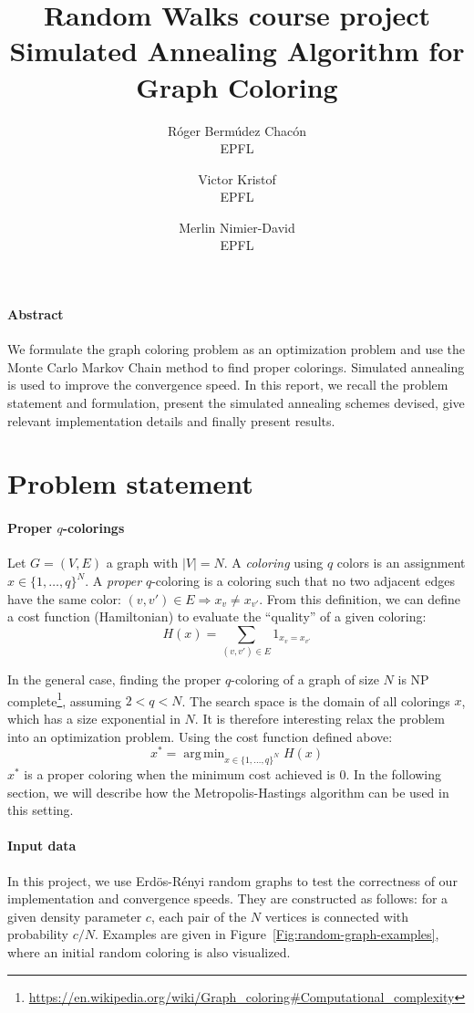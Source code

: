 \documentclass{report}
\title{Random Walks course project\\Simulated Annealing Algorithm for Graph Coloring}
\author{
  R\'oger Berm\'udez Chac\'on\\EPFL
  \and
  Victor Kristof\\EPFL
  \and
  Merlin Nimier-David\\EPFL
}
\DeclareMathOperator*{\argmin}{arg\,min}
\begin{document}
  \maketitle

  \paragraph{Abstract}
  We formulate the graph coloring problem as an optimization problem and use the Monte Carlo Markov Chain method to find proper colorings. Simulated annealing is used to improve the convergence speed. In this report, we recall the problem statement and formulation, present the simulated annealing schemes devised, give relevant implementation details and finally present results.

  \section*{Problem statement}
  \paragraph{Proper $q$-colorings}
  Let $G = (V, E)$ a graph with $|V| = N$. A \emph{coloring} using $q$ colors is an assignment $x \in \{ 1, \ldots, q \}^N$. A \emph{proper} $q$-coloring is a coloring such that no two adjacent edges have the same color: $(v, v') \in E \Rightarrow x_v \neq x_{v'}$. From this definition, we can define a cost function (Hamiltonian) to evaluate the ``quality'' of a given coloring:
  \[
    H(x) = \sum_{(v, v') \in E} 1_{x_v = x_{v'}}
  \]

  In the general case, finding the proper $q$-coloring of a graph of size $N$ is NP complete\footnote{\url{https://en.wikipedia.org/wiki/Graph_coloring#Computational_complexity}}, assuming $2 < q < N$. The search space is the domain of all colorings $x$, which has a size exponential in $N$. It is therefore interesting relax the problem into an optimization problem. Using the cost function defined above:
  \[
    x^* = \argmin_{x \in \{ 1, \ldots, q \}^N} H(x)
  \]
  $x^*$ is a proper coloring when the minimum cost achieved is $0$. In the following section, we will describe how the Metropolis-Hastings algorithm can be used in this setting.

  \paragraph{Input data}
  In this project, we use Erd\"{o}s-R\'{e}nyi random graphs to test the correctness of our implementation and convergence speeds. They are constructed as follows: for a given density parameter $c$, each pair of the $N$ vertices is connected with probability $c / N$. Examples are given in Figure~\ref{Fig:random-graph-examples}, where an initial random coloring is also visualized.
\end{document}
